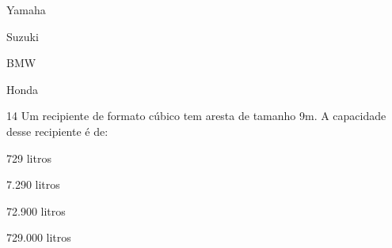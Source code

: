 \begin{escolha}
\item Yamaha
\item Suzuki
\item BMW
\item Honda
\end{escolha}




\num{14} Um recipiente de formato cúbico tem aresta de tamanho 9m. A
capacidade desse recipiente é de:

\begin{escolha}
\item 729 litros
\item 7.290 litros
\item 72.900 litros
\item 729.000 litros
\end{escolha}



